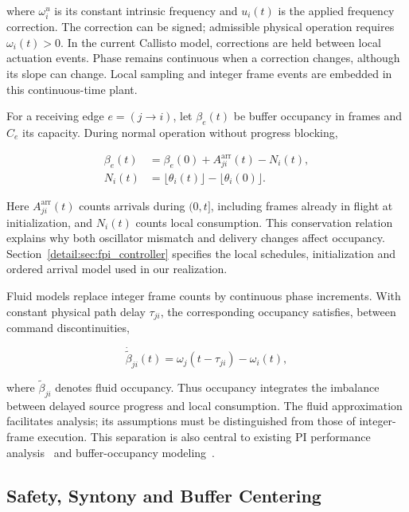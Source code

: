 where $\omega_i^u$ is its constant intrinsic frequency and $u_i(t)$ is the applied frequency correction. The correction can be signed; admissible physical operation requires $\omega_i(t)>0$. In the current Callisto model, corrections are held between local actuation events. Phase remains continuous when a correction changes, although its slope can change. Local sampling and integer frame events are embedded in this continuous-time plant.

For a receiving edge $e=(j\to i)$, let $\beta_e(t)$ be buffer occupancy in frames and $C_e$ its capacity. During normal operation without progress blocking,

\begin{align}
\beta_e(t)&=\beta_e(0)+A_{ji}^{\mathrm{arr}}(t)-N_i(t),\nonumber\\
N_i(t)&=\lfloor\theta_i(t)\rfloor-\lfloor\theta_i(0)\rfloor.
\label{detail:eq:bg_count_balance}
\end{align}

Here $A_{ji}^{\mathrm{arr}}(t)$ counts arrivals during $(0,t]$, including frames already in flight at initialization, and $N_i(t)$ counts local consumption. This conservation relation explains why both oscillator mismatch and delivery changes affect occupancy. Section~\ref{detail:sec:fpi_controller} specifies the local schedules, initialization and ordered arrival model used in our realization.

Fluid models replace integer frame counts by continuous phase increments. With constant physical path delay $\tau_{ji}$, the corresponding occupancy satisfies, between command discontinuities,

\begin{equation}
\dot{\widetilde\beta}_{ji}(t)
=\omega_j(t-\tau_{ji})-\omega_i(t),
\end{equation}

where $\widetilde\beta_{ji}$ denotes fluid occupancy. Thus occupancy integrates the imbalance between delayed source progress and local consumption. The fluid approximation facilitates analysis; its assumptions must be distinguished from those of integer-frame execution. This separation is also central to existing PI performance analysis~\cite{lall2022resistance} and buffer-occupancy modeling~\cite{lall2024bufferOccupancy}.

\subsection{Safety, Syntony and Buffer Centering}


